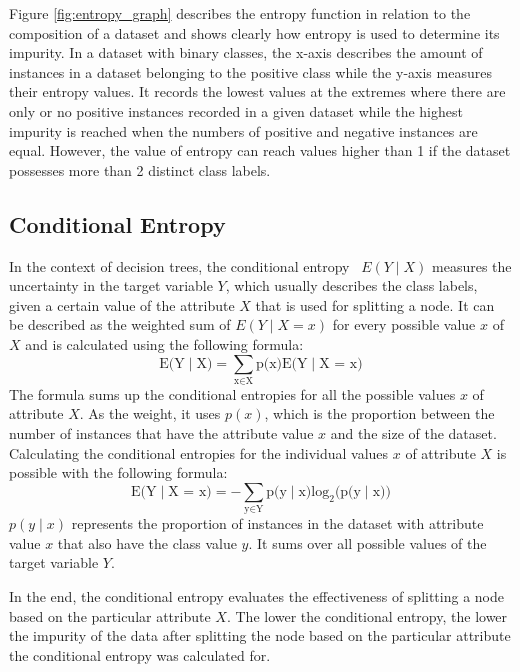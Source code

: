 Figure \ref{fig:entropy_graph} describes the entropy function in relation to the composition of a dataset and shows clearly how entropy is used to determine its impurity.
In a dataset with binary classes, the x-axis describes the amount of instances in a dataset belonging to the positive class while the y-axis measures their entropy values. It records the lowest values at the extremes where there are only or no positive instances recorded in a given dataset while the highest impurity is reached when the numbers of positive and negative instances are equal.
However, the value of entropy can reach values higher than 1 if the dataset possesses more than 2 distinct class labels.


\subsection{Conditional Entropy} \label{conditional_entropy}
In the context of decision trees, the conditional entropy~\cite{conditional_entropy_wiki} $E(Y\mid X)$ measures the uncertainty in the target variable $Y$, which usually describes the class labels, given a certain value of the attribute $X$ that is used for splitting a node.
It can be described as the weighted sum of $E(Y\mid X = x)$ for every possible value $x$ of $X$ and is calculated using the following formula:
\[\text{E(Y}\mid \text{X}) = \sum_{\text{x} \in \text{X}} \text{p(x)} \text{E(Y}\mid \text{X = x)}\]
The formula sums up the conditional entropies for all the possible values $x$ of attribute $X$. As the weight, it uses $p(x)$, which is the proportion between the number of instances that have the attribute value $x$ and the size of the dataset.
Calculating the conditional entropies for the individual values $x$ of attribute $X$ is possible with the following formula:
\[ \text{E(Y}\mid \text{X = x)} = -\sum_{\text{y} \in \text{Y}} \text{p(y}\mid \text{x)} \text{log}_\text{2} \text{(p(y}\mid \text{x))} \]
$p(y\mid x)$ represents the proportion of instances in the dataset with attribute value $x$ that also have the class value $y$. It sums over all possible values of the target variable $Y$.

In the end, the conditional entropy evaluates the effectiveness of splitting a node based on the particular attribute $X$. The lower the conditional entropy, the lower the impurity of the data after splitting the node based on the particular attribute the conditional entropy was calculated for.
\pagebreak

